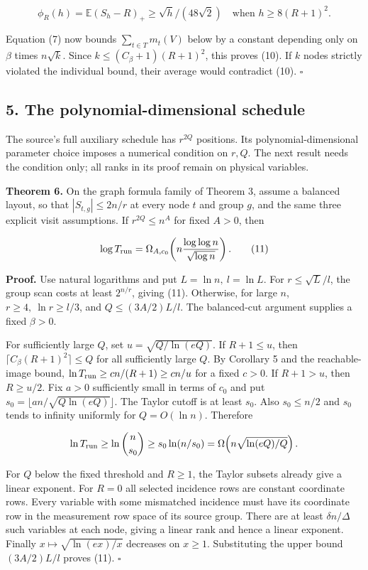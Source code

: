 \documentclass[
  10pt,
]{article}
\begin{document}
\[
        \phi_R(h)=\mathbb E(S_h-R)_+\ge \sqrt h/(48\sqrt2)
         \quad\text{when }h\ge8(R+1)^2.
\]

Equation (7) now bounds \(\sum_{t\in T}m_t(V)\) below by a constant
depending only on \(\beta\) times \(n\sqrt{k}\). Since
\(k\le(C_\beta+1)(R+1)^2\), this proves (10). If \(k\) nodes strictly
violated the individual bound, their average would contradict (10).
\(\square\)

\subsection{5. The polynomial-dimensional
schedule}\label{the-polynomial-dimensional-schedule}

The source's full auxiliary schedule has \(r^{2Q}\) positions. Its
polynomial-dimensional parameter choice imposes a numerical condition on
\(r,Q\). The next result needs the condition only; all ranks in its
proof remain on physical variables.

\textbf{Theorem 6.} On the graph formula family of Theorem 3, assume a
balanced layout, so that \(|S_{t,g}|\le 2n/r\) at every node \(t\) and
group \(g\), and the same three explicit visit assumptions. If
\(r^{2Q}\le n^A\) for fixed \(A>0\), then

\[
       \log T_{\rm run}=\Omega_{A,c_0}\!\left(
                       n\frac{\log\log n}{\sqrt{\log n}}\right).        \tag{11}
\]

\textbf{Proof.} Use natural logarithms and put \(L=\ln n,\ l=\ln L\).
For \(r\le\sqrt L/l\), the group scan costs at least \(2^{n/r}\), giving
(11). Otherwise, for large \(n\), \(r\ge4,\ \ln r\ge l/3\), and
\(Q\le(3A/2)L/l\). The balanced-cut argument supplies a fixed
\(\beta>0\).

For sufficiently large \(Q\), set \(u=\sqrt{Q/\ln(eQ)}\). If
\(R+1\le u\), then \(\lceil C_\beta(R+1)^2\rceil\le Q\) for all
sufficiently large \(Q\). By Corollary 5 and the reachable-image bound,
\(\ln T_{\rm run}\ge c n/(R+1)\ge c n/u\) for a fixed \(c>0\). If
\(R+1>u\), then \(R\ge u/2\). Fix \(a>0\) sufficiently small in terms of
\(c_0\) and put \(s_0=\lfloor an/\sqrt{Q\ln(eQ)}\rfloor\). The Taylor
cutoff is at least \(s_0\). Also \(s_0\le n/2\) and \(s_0\) tends to
infinity uniformly for \(Q=O(\ln n)\). Therefore

\[
       \ln T_{\rm run}\ge\ln\binom n{s_0}
        \ge s_0\ln(n/s_0)=\Omega\!\left(n\sqrt{\ln(eQ)/Q}\right).
\]

For \(Q\) below the fixed threshold and \(R\ge1\), the Taylor subsets
already give a linear exponent. For \(R=0\) all selected incidence rows
are constant coordinate rows. Every variable with some mismatched
incidence must have its coordinate row in the measurement row space of
its source group. There are at least \(\delta n/\Delta\) such variables
at each node, giving a linear rank and hence a linear exponent. Finally
\(x\mapsto\sqrt{\ln(ex)/x}\) decreases on \(x\ge1\). Substituting the
upper bound \((3A/2)L/l\) proves (11). \(\square\)
\end{document}
